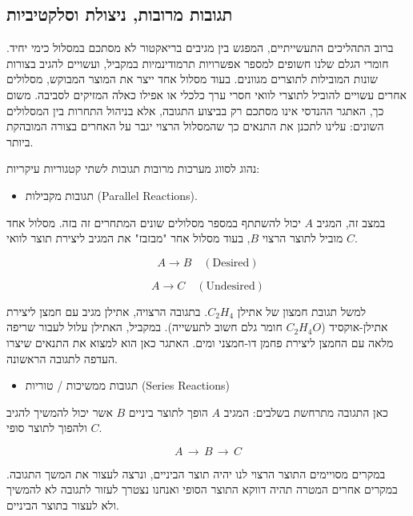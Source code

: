 \documentclass[
  hebrew,
  letterpaper,
  DIV=11,
  numbers=noendperiod]{scrreprt}
\providecommand{\tightlist}{%
  \setlength{\itemsep}{0pt}\setlength{\parskip}{0pt}}
\begin{document}
\subsection{תגובות מרובות, ניצולת
וסלקטיביות}\label{ux5eaux5d2ux5d5ux5d1ux5d5ux5ea-ux5deux5e8ux5d5ux5d1ux5d5ux5ea-ux5e0ux5d9ux5e6ux5d5ux5dcux5ea-ux5d5ux5e1ux5dcux5e7ux5d8ux5d9ux5d1ux5d9ux5d5ux5ea}

ברוב התהליכים התעשייתיים, המפגש בין מגיבים בריאקטור לא מסתכם במסלול כימי
יחיד. חומרי הגלם שלנו \textquotesingle חשופים\textquotesingle{} למספר
אפשרויות תרמודינמיות במקביל, ועשויים להגיב בצורות שונות המובילות לתוצרים
מגוונים. בעוד מסלול אחד ייצר את המוצר המבוקש, מסלולים אחרים עשויים
להוביל לתוצרי לוואי חסרי ערך כלכלי או אפילו כאלה המזיקים לסביבה. משום
כך, האתגר ההנדסי אינו מסתכם רק בביצוע התגובה, אלא בניהול התחרות בין
המסלולים השונים: עלינו לתכנן את התנאים כך שהמסלול הרצוי יגבר על האחרים
בצורה המובהקת ביותר.

נהוג לסווג מערכות מרובות תגובות לשתי קטגוריות עיקריות:

\begin{itemize}
\tightlist
\item
  תגובות מקבילות (Parallel Reactions).
\end{itemize}

במצב זה, המגיב \(A\) יכול להשתתף במספר מסלולים שונים המתחרים זה בזה.
מסלול אחד מוביל לתוצר הרצוי \(B\), בעוד מסלול אחר "מבזבז" את המגיב
ליצירת תוצר לוואי \(C\).

\[A \rightarrow B\quad\left( \text{Desired} \right)\]

\[A \rightarrow C\quad\left( \text{Undesired} \right)\]

למשל תגובת חמצון של אתילן \(C_{2}H_{4}\). בתגובה הרצויה, אתילן מגיב עם
חמצן ליצירת אתילן-אוקסיד (\(C_{2}H_{4}O\) חומר גלם חשוב לתעשייה).
במקביל, האתילן עלול לעבור שריפה מלאה עם החמצן ליצירת פחמן דו-חמצני ומים.
האתגר כאן הוא למצוא את התנאים שיצרו העדפה לתגובה הראשונה.

\begin{itemize}
\tightlist
\item
  תגובות ממשיכות / טוריות (Series Reactions)
\end{itemize}

כאן התגובה מתרחשת בשלבים: המגיב \(A\) הופך לתוצר ביניים \(B\) אשר יכול
להמשיך להגיב ולהפוך לתוצר סופי \(C\).

\[A\, \rightarrow \, B\, \rightarrow \, C\]

במקרים מסויימים התוצר הרצוי לנו יהיה תוצר הביניים, ונרצה לעצור את המשך
התגובה. במקרים אחרים המטרה תהיה דווקא התוצר הסופי ואנחנו נצטרך לעזור
לתגובה לא להמשיך ולא לעצור בתוצר הביניים.
\end{document}
